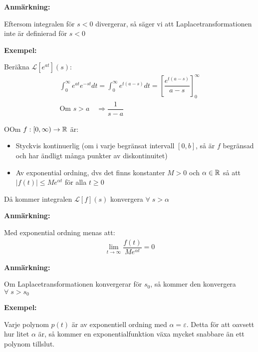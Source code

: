 \par\bigskip
\noindent\textbf{Anmärkning:}\par
\noindent Eftersom integralen för $s<0$ divergerar, så säger vi att Laplacetransformationen inte är definierad för $s<0$
\par\bigskip
\noindent\textbf{Exempel:}\par
\noindent Beräkna $\mathcal{L}[e^{at}](s)$:
\begin{equation*}
  \begin{gathered}
    \int_{0}^{\infty}e^{at}e^{-st}dt = \int_{0}^{\infty}e^{t(a-s)}dt = \left[\dfrac{e^{t(a-s)}}{a-s}\right]_0^\infty\\
    \text{Om } s>a\quad\Rightarrow\dfrac{1}{s-a}
  \end{gathered}
\end{equation*}
\par\bigskip
\begin{theo}
  OOm $f:[0,\infty)\to\mathbb{R}$ är:\par
  \begin{itemize}
    \item Styckvis kontinuerlig (om i varje begränsat intervall $[0,b]$, så är $f$ begränsad och har ändligt många punkter av diskontinuitet)
      \par\bigskip
    \item Av exponential ordning, dvs det finns konstanter $M>0$ och $\alpha\in\mathbb{R}$ så att $\left|f(t)\right|\leq Me^{\alpha t}$ för alla $t\geq0$
  \end{itemize}
  \par\bigskip
  \noindent Då kommer integralen $\mathcal{L}[f](s)$ konvergera $\forall\;s>\alpha$
\end{theo}
\par\bigskip
\noindent\textbf{Anmärkning:}\par
\noindent Med exponential ordning menas att:
\begin{equation*}
  \begin{gathered}
    \lim_{t\to\infty}\dfrac{f(t)}{Me^{\alpha t}} = 0
  \end{gathered}
\end{equation*}
\par\bigskip
\noindent\textbf{Anmärkning:}\par
\noindent Om Laplacetransformationen konvergerar för $s_0$, så kommer den konvergera $\forall\;s>s_0$
\par\bigskip
\noindent\textbf{Exempel:}\par
\noindent Varje polynom $p(t)$ är av exponentiell ordning med $\alpha=\varepsilon$. Detta för att oavsett hur litet $\alpha$ är, så kommer en exponentialfunktion växa mycket snabbare än ett polynom tillslut. 

